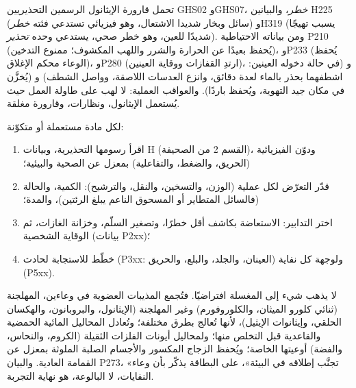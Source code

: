 \begin{example}
تحمل قارورة الإيثانول الرسمين التحذيريين GHS02 وGHS07،  \emph{خطر}، والبيانين H225 (سائل وبخار شديدا الاشتعال، وهو
 فيزيائي تستدعي فئته \emph{خطر}) وH319
(يسبب تهيجًا شديدًا للعين، وهو خطر صحي، يستدعي وحده \emph{تحذير}).
ومن بياناته الاحتياطية P210 (يُحفظ بعيدًا عن الحرارة والشرر
واللهب المكشوف؛ ممنوع التدخين)، وP233 (يُحفظ الوعاء محكم الإغلاق)، وP280
(ارتدِ القفازات ووقاية العينين)، و (في حالة دخوله العينين: اشطفهما
بحذر بالماء لعدة دقائق، وانزع العدسات اللاصقة، وواصل
الشطف) و (يُخزَّن في مكان جيد التهوية، ويُحفظ باردًا).
والعواقب العملية: لا لهب على طاولة العمل حيث يُستعمل الإيثانول،
ونظارات، وقارورة مغلقة.
\end{example}

\begin{method}\label{met:b1:lab-techniques-1:read-sds}
لكل مادة مستعملة أو متكوّنة:
\begin{enumerate}
  \item اقرأ رسومها التحذيرية،  وبيانات H (القسم 2 من
        الصحيفة)، ودوّن  الفيزيائية (الحريق، والضغط،
        والتفاعلية) بمعزل عن  الصحية والبيئية؛
  \item قدّر التعرّض لكل عملية (الوزن، والتسخين، والنقل، والترشيح):
        الكمية، والحالة (فالسائل المتطاير أو
        المسحوق الناعم يبلغ الرئتين)، والمدة؛
  \item اختر التدابير: الاستعاضة بكاشف أقل خطرًا،
        وتصغير السلّم، وخزانة الغازات، ثم الوقاية الشخصية (بيانات
        P2xx)؛
  \item خطّط للاستجابة لحادث (P3xx: العينان، والجلد، والبلع،
        والحريق) ولوجهة كل نفاية (P5xx).
\end{enumerate}
\end{method}

\begin{inthelab}[النفايات]
لا يذهب شيء إلى المغسلة افتراضيًا. فتُجمع المذيبات العضوية في
وعاءين، المهلجنة (ثنائي كلورو الميثان، والكلوروفورم)
وغير المهلجنة (الإيثانول، والبروبانون، والهكسان الحلقي، وإيثانوات الإيثيل)، لأنها
تُعالج بطرق مختلفة؛ وتُعادل المحاليل المائية الحمضية والقاعدية
قبل التخلص منها؛ ولمحاليل أيونات الفلزات الثقيلة (الكروم،
والنحاس، والفضة) أوعيتها الخاصة؛ ويُحفظ الزجاج المكسور والأجسام الصلبة
الملوثة بمعزل عن القمامة العادية. والبيان P273، «تجنَّب
إطلاقه في البيئة»، على البطاقة يذكّر بأن وعاء النفايات،
لا البالوعة، هو نهاية التجربة.
\end{inthelab}

